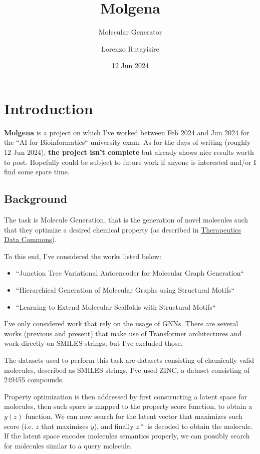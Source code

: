 \documentclass{article}
\title{Molgena}
\subtitle{Molecular Generator}
\author{Lorenzo Rutayisire}
\date{12 Jun 2024}
\begin{document}
\maketitle
\tableofcontents

\section{Introduction}

\textbf{Molgena} is a project on which I've worked between Feb 2024 and Jun 2024 for the ``AI for Bioinformatics`` university exam.
As for the days of writing (roughly 12 Jun 2024), \textbf{the project isn't complete} but already shows nice results worth to post.
Hopefully could be subject to future work if anyone is interested and/or I find some spare time.

\subsection{Background}

The task is Molecule Generation, that is the generation of novel molecules such that they
optimize a desired chemical property (as described in \href{https://tdcommons.ai/generation_tasks/molgen/}{Therapeutics Data Commons}).

To this end, I've considered the works listed below:

\begin{itemize}
\item ``Junction Tree Variational Autoencoder for Molecular Graph Generation`` \cite{jtvae2019}
\item ``Hierarchical Generation of Molecular Graphs using Structural Motifs`` \cite{hievae2020}
\item ``Learning to Extend Molecular Scaffolds with Structural Motifs`` \cite{microsoft2024}
\end{itemize}

I've only considered work that rely on the usage of GNNs. There are several works (previous and present) that make use
of Transformer architectures and work directly on SMILES strings, but I've excluded those.

The datasets used to perform this task are datasets consisting of chemically valid molecules, described as SMILES
strings. I've used ZINC, a dataset consisting of 249455 compounds.

Property optimization is then addressed by first constructing a latent space for molecules, then such space is mapped
to the property score function, to obtain a $y(z)$ function. We can now search for the latent vector that maximizes
such score (i.e. $z$ that maximizes $y$), and finally $z*$ is decoded to obtain the molecule. If the latent space
encodes molecules semantics properly, we can possibly search for molecules similar to a query molecule.
\end{document}
